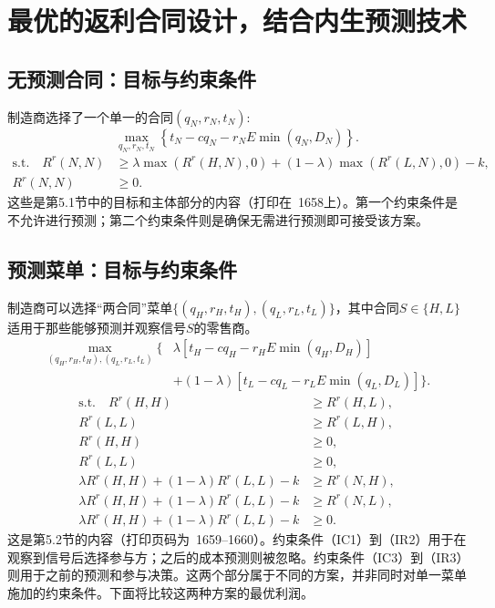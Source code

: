 \documentclass{article}
\begin{document}
\section*{最优的返利合同设计，结合内生预测技术}

\subsection*{无预测合同：目标与约束条件}
制造商选择了一个单一的合同$(q_N,r_N,t_N)$:
\begin{equation}
\max_{q_N,r_N,t_N}\left\{t_N-cq_N-r_NE\min(q_N,D_N)\right\}.
\tag{OBJ--N}
\end{equation}
\begin{align}
\text{s.t.}\quad R^r(N,N)&\geq \lambda\max(R^r(H,N),0)
 +(1-\lambda)\max(R^r(L,N),0)-k,\tag{IC}\\
R^r(N,N)&\geq 0.\tag{IR}
\end{align}
这些是第5.1节中的目标和主体部分的内容（打印在~1658上）。第一个约束条件是不允许进行预测；第二个约束条件则是确保无需进行预测即可接受该方案。

\subsection*{预测菜单：目标与约束条件}
制造商可以选择“两合同”菜单$\{(q_H,r_H,t_H),(q_L,r_L,t_L)\}$，其中合同$S\in\{H,L\}$适用于那些能够预测并观察信号$S$的零售商。
\begin{equation}
\begin{split}
\max_{(q_H,r_H,t_H),(q_L,r_L,t_L)}\bigl\{
&\lambda[t_H-cq_H-r_HE\min(q_H,D_H)]\\
&+(1-\lambda)[t_L-cq_L-r_LE\min(q_L,D_L)]\bigr\}.
\end{split}
\tag{OBJ--F}
\end{equation}
\begin{align}
\text{s.t.}\quad R^r(H,H)&\geq R^r(H,L),\tag{IC1}\\
R^r(L,L)&\geq R^r(L,H),\tag{IC2}\\
R^r(H,H)&\geq 0,\tag{IR1}\\
R^r(L,L)&\geq 0,\tag{IR2}\\
\lambda R^r(H,H)+(1-\lambda)R^r(L,L)-k
&\geq R^r(N,H),\tag{IC3}\\
\lambda R^r(H,H)+(1-\lambda)R^r(L,L)-k
&\geq R^r(N,L),\tag{IC4}\\
\lambda R^r(H,H)+(1-\lambda)R^r(L,L)-k
&\geq 0.\tag{IR3}
\end{align}
这是第5.2节的内容（打印页码为~1659–1660）。约束条件（IC1）到（IR2）用于在观察到信号后选择参与方；之后的成本预测则被忽略。约束条件（IC3）到（IR3）则用于之前的预测和参与决策。这两个部分属于不同的方案，并非同时对单一菜单施加的约束条件。下面将比较这两种方案的最优利润。
\end{document}
